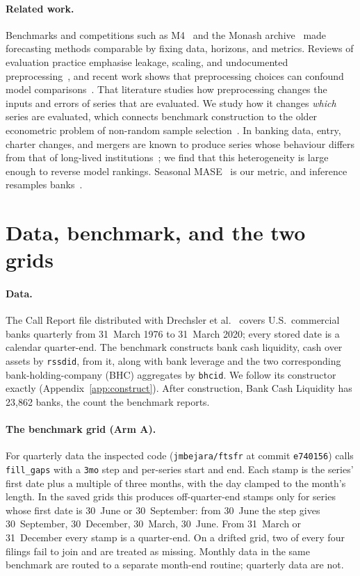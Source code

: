 \documentclass[11pt]{article}
\begin{document}
\paragraph{Related work.} Benchmarks and competitions such as M4~\cite{makridakis2020} and the Monash archive~\cite{godahewa2021} made forecasting methods comparable by fixing data, horizons, and metrics. Reviews of evaluation practice emphasise leakage, scaling, and undocumented preprocessing~\cite{tashman2000,hewamalage2023}, and recent work shows that preprocessing choices can confound model comparisons~\cite{preproc2026,moretti2026}. That literature studies how preprocessing changes the inputs and errors of series that are evaluated. We study how it changes \emph{which} series are evaluated, which connects benchmark construction to the older econometric problem of non-random sample selection~\cite{heckman1979}. In banking data, entry, charter changes, and mergers are known to produce series whose behaviour differs from that of long-lived institutions~\cite{deyoung1999}; we find that this heterogeneity is large enough to reverse model rankings. Seasonal MASE~\cite{hyndman2006} is our metric, and inference resamples banks~\cite{davison1997,field2007,cameron2008}.

\section{Data, benchmark, and the two grids}\label{sec:data}
\paragraph{Data.} The Call Report file distributed with Drechsler et al.~\cite{drechsler2017} covers U.S.\ commercial banks quarterly from 31~March 1976 to 31~March 2020; every stored date is a calendar quarter-end. The benchmark constructs bank cash liquidity, cash over assets by \texttt{rssdid}, from it, along with bank leverage and the two corresponding bank-holding-company (BHC) aggregates by \texttt{bhcid}. We follow its constructor exactly (Appendix~\ref{app:construct}). After construction, Bank Cash Liquidity has 23,862 banks, the count the benchmark reports.

\paragraph{The benchmark grid (Arm A).} For quarterly data the inspected code (\texttt{jmbejara/ftsfr} at commit \texttt{e740156}) calls \texttt{fill\_gaps} with a \texttt{3mo} step and per-series start and end. Each stamp is the series' first date plus a multiple of three months, with the day clamped to the month's length. In the saved grids this produces off-quarter-end stamps only for series whose first date is 30~June or 30~September: from 30~June the step gives 30~September, 30~December, 30~March, 30~June. From 31~March or 31~December every stamp is a quarter-end. On a drifted grid, two of every four filings fail to join and are treated as missing. Monthly data in the same benchmark are routed to a separate month-end routine; quarterly data are not.
\end{document}
